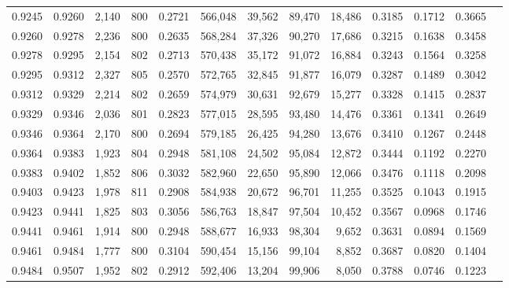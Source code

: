 \begin{tabular}{rrrrrrrrrrrrr}
0.9245 & 0.9260 &  2,140 & 800 &                                     0.2721 & 566,048 &  39,562 &  89,470 &  18,486 & 0.3185 & 0.1712 & 0.3665 \\
0.9260 & 0.9278 &  2,236 & 800 &                                     0.2635 & 568,284 &  37,326 &  90,270 &  17,686 & 0.3215 & 0.1638 & 0.3458 \\
0.9278 & 0.9295 &  2,154 & 802 &                                     0.2713 & 570,438 &  35,172 &  91,072 &  16,884 & 0.3243 & 0.1564 & 0.3258 \\
0.9295 & 0.9312 &  2,327 & 805 &                                     0.2570 & 572,765 &  32,845 &  91,877 &  16,079 & 0.3287 & 0.1489 & 0.3042 \\
0.9312 & 0.9329 &  2,214 & 802 &                                     0.2659 & 574,979 &  30,631 &  92,679 &  15,277 & 0.3328 & 0.1415 & 0.2837 \\
0.9329 & 0.9346 &  2,036 & 801 &                                     0.2823 & 577,015 &  28,595 &  93,480 &  14,476 & 0.3361 & 0.1341 & 0.2649 \\
0.9346 & 0.9364 &  2,170 & 800 &                                     0.2694 & 579,185 &  26,425 &  94,280 &  13,676 & 0.3410 & 0.1267 & 0.2448 \\
0.9364 & 0.9383 &  1,923 & 804 &                                     0.2948 & 581,108 &  24,502 &  95,084 &  12,872 & 0.3444 & 0.1192 & 0.2270 \\
0.9383 & 0.9402 &  1,852 & 806 &                                     0.3032 & 582,960 &  22,650 &  95,890 &  12,066 & 0.3476 & 0.1118 & 0.2098 \\
0.9403 & 0.9423 &  1,978 & 811 &                                     0.2908 & 584,938 &  20,672 &  96,701 &  11,255 & 0.3525 & 0.1043 & 0.1915 \\
0.9423 & 0.9441 &  1,825 & 803 &                                     0.3056 & 586,763 &  18,847 &  97,504 &  10,452 & 0.3567 & 0.0968 & 0.1746 \\
0.9441 & 0.9461 &  1,914 & 800 &                                     0.2948 & 588,677 &  16,933 &  98,304 &   9,652 & 0.3631 & 0.0894 & 0.1569 \\
0.9461 & 0.9484 &  1,777 & 800 &                                     0.3104 & 590,454 &  15,156 &  99,104 &   8,852 & 0.3687 & 0.0820 & 0.1404 \\
0.9484 & 0.9507 &  1,952 & 802 &                                     0.2912 & 592,406 &  13,204 &  99,906 &   8,050 & 0.3788 & 0.0746 & 0.1223 \\

\end{tabular}
